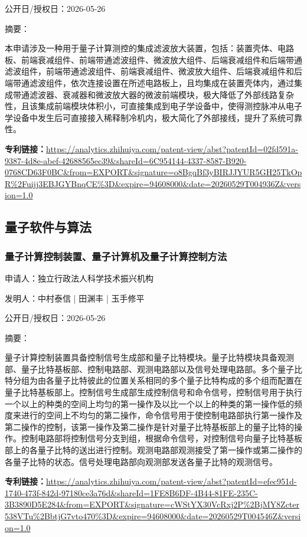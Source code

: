 \documentclass[12pt,a4paper]{ctexart}
\begin{document}
公开日/授权日：2026-05-26

摘要：

本申请涉及一种用于量子计算测控的集成滤波放大装置，包括：装置壳体、电路板、前端衰减组件、前端带通滤波组件、微波放大组件、后端衰减组件和后端带通滤波组件，前端带通滤波组件、前端衰减组件、微波放大组件、后端衰减组件和后端带通滤波组件，依次连接设置在所述电路板上，且均集成在装置壳体内，通过集成带通滤波器、衰减器和微波放大器的微波前端模块，极大降低了外部线路复杂性，且该集成前端模块体积小，可直接集成到电子学设备中，使得测控脉冲从电子学设备中发生后可直接接入稀释制冷机内，极大简化了外部接线，提升了系统可靠性。

\noindent\textbf{专利链接：}\url{https://analytics.zhihuiya.com/patent-view/abst?patentId=02fd591a-9387-4d8e-abef-42688565ec39&shareId=6C954144-4337-8587-B920-0768CD63F0BC&from=EXPORT&signature=o8BgqBf3yBIRJJYUR5GH25TkOpR%2Fuijj3EBJGYBnqCE%3D&expire=94608000&date=20260529T004936Z&version=1.0}


\subsection{ 量子软件与算法 }

\subsubsection{ 量子计算控制装置、量子计算机及量子计算控制方法 }

申请人：独立行政法人科学技术振兴机构

发明人：中村泰信 | 田渊丰 | 玉手修平

公开日/授权日：2026-05-26

摘要：

量子计算控制装置具备控制信号生成部和量子比特模块。量子比特模块具备观测部、量子比特基板部、控制电路部、观测电路部以及信号处理电路部。多个量子比特分组为由各量子比特彼此的位置关系相同的多个量子比特构成的多个组而配置在量子比特基板部上。控制信号生成部生成控制信号和命令信号，控制信号用于执行一个以上的种类的空间上均匀的第一操作及以比一个以上的种类的第一操作低的频度来进行的空间上不均匀的第二操作，命令信号用于使控制电路部执行第一操作及第二操作的控制，该第一操作及第二操作是针对量子比特基板部上的量子比特的操作。控制电路部将控制信号分支到组，根据命令信号，对控制信号向量子比特基板部上的各量子比特的送出进行控制。观测电路部观测接受了第一操作或第二操作的各量子比特的状态。信号处理电路部向观测部发送各量子比特的观测信号。

\noindent\textbf{专利链接：}\url{https://analytics.zhihuiya.com/patent-view/abst?patentId=efec951d-1740-473f-842d-97180ce3a76d&shareId=1FE8B6DF-4B44-81FE-235C-3B3890D5E284&from=EXPORT&signature=cWStYX30VcRxj2P%2BjMY8Zcter538VTu%2BbtjG7vto470%3D&expire=94608000&date=20260529T004546Z&version=1.0}
\end{document}
